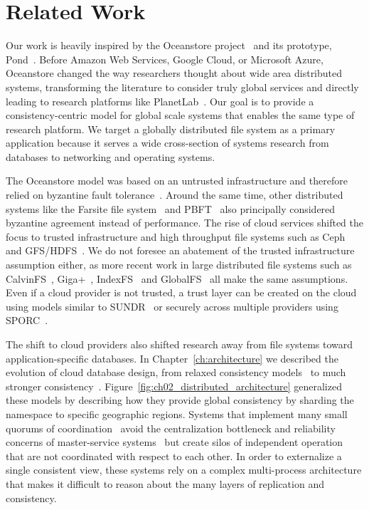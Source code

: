 
\renewcommand{\thechapter}{7}

\chapter{Related Work}
\label{ch:related_work}

Our work is heavily inspired by the Oceanstore project~\cite{oceanstore} and its prototype, Pond~\cite{pond}.
Before Amazon Web Services, Google Cloud, or Microsoft Azure, Oceanstore changed the way researchers thought about wide area distributed systems, transforming the literature to consider truly global services and directly leading to research platforms like PlanetLab~\cite{planetlab}.
Our goal is to provide a consistency-centric model for global scale systems that enables the same type of research platform.
We target a globally distributed file system as a primary application because it serves a wide cross-section of systems research from databases to networking and operating systems.

The Oceanstore model was based on an untrusted infrastructure and therefore relied on byzantine fault tolerance~\cite{byzantine-generals, byzantine_fault_tolerance,fail-stop,ho_nysiad_2008,kotla_zyzzyva_2007,singh_zeno_2009}.
Around the same time, other distributed systems like the Farsite file system~\cite{farsite,farsite_byzantine} and PBFT~\cite{pbft} also principally considered byzantine agreement instead of performance.
The rise of cloud services shifted the focus to trusted infrastructure and high throughput file systems such as Ceph~\cite{ceph} and GFS/HDFS~\cite{gfs,hdfs,hadoop_hdfs}.
We do not foresee an abatement of the trusted infrastructure assumption either, as more recent work in large distributed file systems such as CalvinFS~\cite{calvinfs}, Giga+~\cite{giga+,giga+_scale}, IndexFS~\cite{indexfs} and GlobalFS~\cite{globalfs} all make the same assumptions.
Even if a cloud provider is not trusted, a trust layer can be created on the cloud using models similar to SUNDR~\cite{sundr} or securely across multiple providers using SPORC~\cite{sporc}.

The shift to cloud providers also shifted research away from file systems toward application-specific databases.
In Chapter~\ref{ch:architecture} we described the evolution of cloud database design, from relaxed consistency models~\cite{bigtable,dynamo,pnuts,cassandra,hbase} to much stronger consistency~\cite{megastore,spanner,aurora}.
Figure~\ref{fig:ch02_distributed_architecture} generalized these models by describing how they provide global consistency by sharding the namespace to specific geographic regions.
Systems that implement many small quorums of coordination~\cite{mdcc,scatter,spanner} avoid the centralization bottleneck and reliability concerns of master-service systems~\cite{gray_dangers_1996,gfs} but create silos of independent operation that are not coordinated with respect to each other.
In order to externalize a single consistent view, these systems rely on a complex multi-process architecture that makes it difficult to reason about the many layers of replication and consistency.

